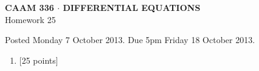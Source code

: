 \documentclass[10pt]{article}
\begin{document}
\vspace*{-5em}
\begin{center}
\large \textsf{\textbf{CAAM 336 $\cdot$ DIFFERENTIAL EQUATIONS}\\[0.5em]
Homework 25 }
\end{center}

Posted Monday 7 October 2013.  Due 5pm Friday 18 October 2013.

\begin{enumerate}\addtocounter{enumi}{24}
\item {[25 points]}  
\end{enumerate}
\end{document}
